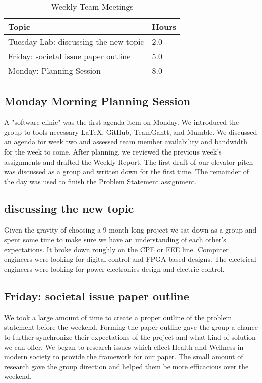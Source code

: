 \documentclass[12pt,article,compsoc]{IEEEtran}
\begin{document}
	
	\begin{table}[ht]
		\renewcommand{\arraystretch}{1.3}
			\caption{Weekly Team Meetings}
			
			\label{Team Hour Summary}
			
			\centering
			\begin{tabular}{p{7cm}|p{1cm}}
			\hline
			\bfseries 	Topic 										& \bfseries Hours	\\
			\hline\hline
						Tuesday Lab: discussing the new topic 		& 2.0				\\	
						Friday: societal issue paper outline		& 5.0				\\
						Monday: Planning Session					& 8.0				\\	
			\hline
			\end{tabular}
		\end{table}
		 
	\subsection{Monday Morning Planning Session}
	
		A "software clinic" was the first agenda item on Monday. We introduced the group to tools necessary \LaTeX, 
		GitHub, TeamGantt, and Mumble. We discussed an agenda for week two and assessed team member availability and 
		bandwidth for the week to come. After planning, we reviewed the previous week's assignments and drafted the 
		Weekly Report. The first draft of our elevator pitch was discussed as a group and written down for the first time. 
		The remainder of the day was used to finish the Problem Statement assignment.
		
	\subsection{discussing the new topic}
		Given the gravity of choosing a 9-month long project we sat down as a group and spent some time to make sure 
		we have an understanding of each other’s expectations. It broke down roughly on the CPE or EEE line. Computer 
		engineers were looking for digital control and FPGA based designs. The electrical engineers were looking for 
		power electronics design and electric control.  
		
	\subsection{Friday: societal issue paper outline}
		We took a large amount of time to create a proper outline of the problem statement before the weekend. 
		Forming the paper outline gave the group a chance to further synchronize their expectations of the project 
		and what kind of solution we can offer. We began to research issues which effect Health and Wellness in 
		modern society to provide the framework for our paper. The small amount of research gave the group direction 
		and helped them be more efficacious over the weekend. 
		 
\end{document}
